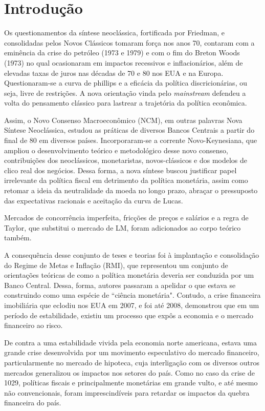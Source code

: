 \documentclass[report]{uftex}
\begin{document}
\section{Introdução}

Os questionamentos da síntese neoclássica, fortificada por Friedman, e consolidadas pelos Novos Clássicos tomaram força nos anos 70, contaram com a eminência da crise do petróleo (1973 e 1979) e com o fim do Breton Woods (1973) no qual ocasionaram em impactos recessivos e inflacionários, além de elevadas taxas de juros nas décadas de 70 e 80 nos EUA e na Europa. Questionaram-se a curva de phillips e a eficácia da política discricionárias, ou seja, livre de restrições. A nova orientação vinda pelo \textit{mainstream} defendeu a volta do pensamento clássico para lastrear a trajetória da política econômica. 

Assim, o Novo Consenso Macroeconômico (NCM), em outras palavras Nova Síntese Neoclássica, estudou as práticas de diversos Bancos Centrais a partir do final de 80 em diversos países. Incorporaram-se a corrente Novo-Keynesiana, que ampliou o desenvolvimento teórico e metodológico desse novo consenso, contribuições dos neoclássicos, monetaristas, novos-clássicos e dos modelos de clico real dos negócios. Dessa forma, a nova síntese buscou justificar papel irrelevante da política fiscal em detrimento da política monetária, assim como retomar a ideia da neutralidade da moeda no longo prazo, abraçar o pressuposto das expectativas racionais e aceitação da curva de Lucas.

Mercados de concorrência imperfeita, fricções de preços e salários e a regra de Taylor, que substitui o mercado de LM, foram adicionados ao corpo teórico também.

A consequência desse conjunto de teses e teorias foi à implantação e consolidação do Regime de Metas e Inflação (RMI), que representou um conjunto de orientações teóricas de como a política monetária deveria ser conduzida por um Banco Central. Dessa, forma, autores passaram a apelidar o que estava se construindo como uma espécie de ``ciência monetária". Contudo, a crise financeira imobiliária que eclodiu nos EUA em 2007, e foi até 2008, demonstrou que em um período de estabilidade, existiu um processo que expôs a economia e o mercado financeiro ao risco.

De contra a uma estabilidade vivida pela economia norte americana, estava uma grande crise desenvolvida por um movimento especulativo do mercado financeiro, particularmente no mercado de hipoteca, cuja interligação com os diversos outros mercados generalizou os impactos nos setores do país. Como no caso da crise de 1029, políticas fiscais e principalmente monetárias em grande vulto, e até mesmo não convencionais, foram imprescindíveis para retardar os impactos da quebra financeira do país.
\end{document}
